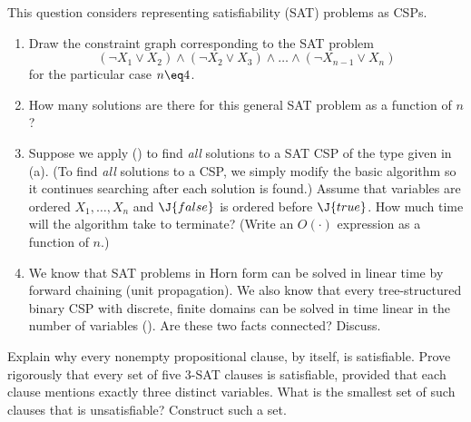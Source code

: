 \begin{iexercise}%
This question considers representing satisfiability
(SAT) problems as CSPs.
\begin{enumerate}
\item  Draw the constraint graph corresponding to the SAT problem
\[
  (\lnot X_1 \lor X_2) \land (\lnot X_2 \lor X_3) \land \ldots \land (\lnot X_{n-1} \lor X_n)
\]
for the particular case \(n\eq 4\).
\item  How many solutions are there for this general SAT problem as a function of \(n\)?
\item  Suppose we apply  () to find {\em all} solutions
to a SAT CSP of the type given in (a). (To find {\em all} solutions to a CSP, we simply modify
the basic algorithm so it continues searching after each solution is found.)
Assume that variables are ordered \(X_1,\ldots,X_n\) and \(\J{false}\) is ordered before \(\J{true}\).
How much time will the algorithm take to terminate? (Write an \(O(\cdot)\) expression as a function of \(n\).)
\item  We know that SAT problems in Horn form can be solved in linear time by forward chaining (unit propagation).
We also know that every tree-structured binary CSP with discrete, finite domains can be solved in time linear in the number of variables ().
Are these two facts connected? Discuss.
\end{enumerate}
\end{iexercise} 

\begin{uexercise}%
Explain why every nonempty propositional clause, by itself, is
satisfiable.  Prove rigorously that every set of five 3-SAT clauses is
satisfiable, provided that each clause mentions exactly three distinct
variables. What is the smallest set of such clauses that is unsatisfiable?
Construct such a set.
\end{uexercise} 

